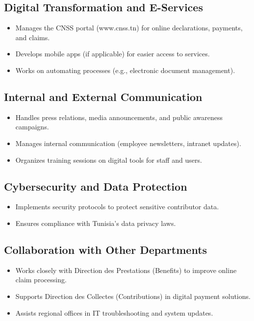 \subsection{Digital Transformation and E-Services}
\begin{itemize}
    \item Manages the CNSS portal (www.cnss.tn) for online declarations, payments, and claims.
    \item Develops mobile apps (if applicable) for easier access to services.
    \item Works on automating processes (e.g., electronic document management).
\end{itemize}
\subsection{Internal and External Communication}
\begin{itemize}
    \item Handles press relations, media announcements, and public awareness campaigns.
    \item Manages internal communication (employee newsletters, intranet updates).
    \item Organizes training sessions on digital tools for staff and users.
\end{itemize}
\subsection{Cybersecurity and Data Protection}
\begin{itemize}
    \item Implements security protocols to protect sensitive contributor data.
    \item Ensures compliance with Tunisia’s data privacy laws.
\end{itemize}

\subsection{Collaboration with Other Departments}
\begin{itemize}
    \item Works closely with Direction des Prestations (Benefits) to improve online claim processing.
    \item Supports Direction des Collectes (Contributions) in digital payment solutions.
    \item Assists regional offices in IT troubleshooting and system updates.
\end{itemize}
